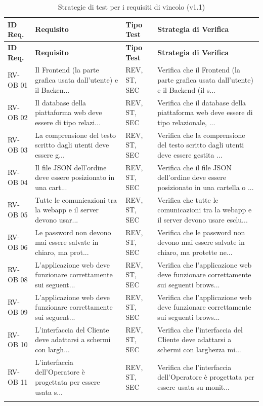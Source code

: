 \documentclass[a4paper,11pt,oneside]{scrartcl}
\begin{document}
\begin{longtable}{|p{1.5cm}|p{5.5cm}|p{1.8cm}|p{5cm}|}
\hline
\textbf{ID Req.} & \textbf{Requisito} & \textbf{Tipo Test} & \textbf{Strategia di Verifica} \\
\hline
\endfirsthead
\hline
\textbf{ID Req.} & \textbf{Requisito} & \textbf{Tipo Test} & \textbf{Strategia di Verifica} \\
\hline
\endhead

RV-OB 01 & Il Frontend (la parte grafica usata dall'utente) e il Backen... & REV, ST, SEC & Verifica che il Frontend (la parte grafica usata dall'utente) e il Backend (il s... \\ \hline
RV-OB 02 & Il database della piattaforma web deve essere di tipo relazi... & REV, ST, SEC & Verifica che il database della piattaforma web deve essere di tipo relazionale, ... \\ \hline
RV-OB 03 & La comprensione del testo scritto dagli utenti deve essere g... & REV, ST, SEC & Verifica che la comprensione del testo scritto dagli utenti deve essere gestita ... \\ \hline
RV-OB 04 & Il file JSON dell'ordine deve essere posizionato in una cart... & REV, ST, SEC & Verifica che il file JSON dell'ordine deve essere posizionato in una cartella o ... \\ \hline
RV-OB 05 & Tutte le comunicazioni tra la webapp e il server devono usar... & REV, ST, SEC & Verifica che tutte le comunicazioni tra la webapp e il server devono usare esclu... \\ \hline
RV-OB 06 & Le password non devono mai essere salvate in chiaro, ma prot... & REV, ST, SEC & Verifica che le password non devono mai essere salvate in chiaro, ma protette ne... \\ \hline
RV-OB 08 & L'applicazione web deve funzionare correttamente sui seguent... & REV, ST, SEC & Verifica che l'applicazione web deve funzionare correttamente sui seguenti brows... \\ \hline
RV-OB 09 & L'applicazione web deve funzionare correttamente sui seguent... & REV, ST, SEC & Verifica che l'applicazione web deve funzionare correttamente sui seguenti brows... \\ \hline
RV-OB 10 & L'interfaccia del Cliente deve adattarsi a schermi con largh... & REV, ST, SEC & Verifica che l'interfaccia del Cliente deve adattarsi a schermi con larghezza mi... \\ \hline
RV-OB 11 & L'interfaccia dell'Operatore è progettata per essere usata s... & REV, ST, SEC & Verifica che l'interfaccia dell'Operatore è progettata per essere usata su monit... \\ \hline
\caption{Strategie di test per i requisiti di vincolo (v1.1)}
\end{longtable}
\end{document}

